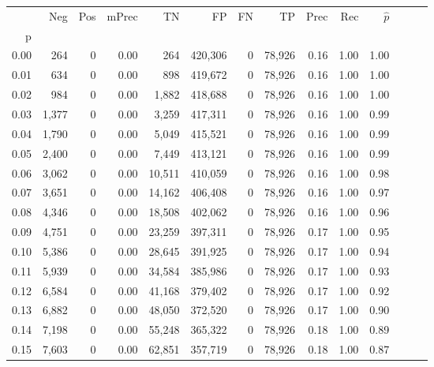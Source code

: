 \begin{tabular}{rrrrrrrrrrrrrr}
\toprule
{} &    Neg &    Pos & mPrec &       TN &       FP &      FN &      TP &  Prec &   Rec & $\hat{p}$ \\
p    &        &        &       &          &          &         &         &       &       &           \\
\midrule
0.00 &    264 &      0 &  0.00 &      264 &  420,306 &       0 &  78,926 &  0.16 &  1.00 &      1.00 \\
0.01 &    634 &      0 &  0.00 &      898 &  419,672 &       0 &  78,926 &  0.16 &  1.00 &      1.00 \\
0.02 &    984 &      0 &  0.00 &    1,882 &  418,688 &       0 &  78,926 &  0.16 &  1.00 &      1.00 \\
0.03 &  1,377 &      0 &  0.00 &    3,259 &  417,311 &       0 &  78,926 &  0.16 &  1.00 &      0.99 \\
0.04 &  1,790 &      0 &  0.00 &    5,049 &  415,521 &       0 &  78,926 &  0.16 &  1.00 &      0.99 \\
0.05 &  2,400 &      0 &  0.00 &    7,449 &  413,121 &       0 &  78,926 &  0.16 &  1.00 &      0.99 \\
0.06 &  3,062 &      0 &  0.00 &   10,511 &  410,059 &       0 &  78,926 &  0.16 &  1.00 &      0.98 \\
0.07 &  3,651 &      0 &  0.00 &   14,162 &  406,408 &       0 &  78,926 &  0.16 &  1.00 &      0.97 \\
0.08 &  4,346 &      0 &  0.00 &   18,508 &  402,062 &       0 &  78,926 &  0.16 &  1.00 &      0.96 \\
0.09 &  4,751 &      0 &  0.00 &   23,259 &  397,311 &       0 &  78,926 &  0.17 &  1.00 &      0.95 \\
0.10 &  5,386 &      0 &  0.00 &   28,645 &  391,925 &       0 &  78,926 &  0.17 &  1.00 &      0.94 \\
0.11 &  5,939 &      0 &  0.00 &   34,584 &  385,986 &       0 &  78,926 &  0.17 &  1.00 &      0.93 \\
0.12 &  6,584 &      0 &  0.00 &   41,168 &  379,402 &       0 &  78,926 &  0.17 &  1.00 &      0.92 \\
0.13 &  6,882 &      0 &  0.00 &   48,050 &  372,520 &       0 &  78,926 &  0.17 &  1.00 &      0.90 \\
0.14 &  7,198 &      0 &  0.00 &   55,248 &  365,322 &       0 &  78,926 &  0.18 &  1.00 &      0.89 \\
0.15 &  7,603 &      0 &  0.00 &   62,851 &  357,719 &       0 &  78,926 &  0.18 &  1.00 &      0.87 \\

\end{tabular}
